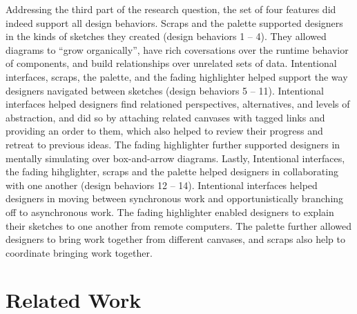 \documentclass[12pt,fleqn]{ucithesis}
\begin{document}
Addressing the third part of the research question, the set of four features did indeed support all design behaviors. Scraps and the palette supported designers in the kinds of sketches they created (design behaviors 1 -- 4). They allowed diagrams to ``grow organically'', have rich coversations over the runtime behavior of components, and build relationships over unrelated sets of data. Intentional interfaces, scraps, the palette, and the fading highlighter helped support the way designers navigated between sketches (design behaviors 5 -- 11). Intentional interfaces helped designers find relationed perspectives, alternatives, and levels of abstraction, and did so by attaching related canvases with tagged links and providing an order to them, which also helped to review their progress and retreat to previous ideas. The fading highlighter further supported designers in mentally simulating over box-and-arrow diagrams. Lastly, Intentional interfaces, the fading hihglighter, scraps and the palette helped designers in collaborating with one another (design behaviors 12 -- 14). Intentional interfaces helped designers in moving between synchronous work and opportunistically branching off to asynchronous work. The fading highlighter enabled designers to explain their sketches to one another from remote computers. The palette further allowed designers to bring work together from different canvases, and scraps also help to coordinate bringing work together.





%
%

 \newpage 
 \newpage \chapter{Related Work}
\label{chapter:related-work}
\end{document}

